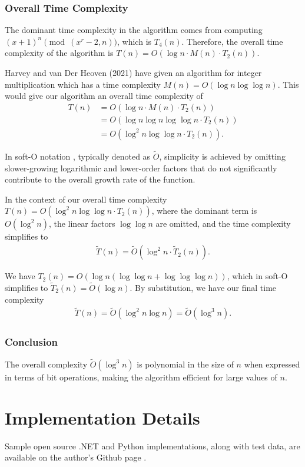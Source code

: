 \documentclass{article}
\theoremstyle{plain}
\theoremstyle{definition}
\begin{document}
\subsubsection{Overall Time Complexity}
The dominant time complexity in the algorithm comes from computing $(x+1)^n \pmod{(x^r-2,n)}$, which is $T_4(n)$. Therefore, the overall time complexity of the algorithm is $T(n) = O(\log n \cdot M(n) \cdot T_2(n))$.

Harvey and van Der Heoven (2021) \cite{harveyvanderhoeven2021} have given an algorithm for integer multiplication which has a time complexity $M(n) = O(\log n \log\log n)$. This would give our algorithm an overall time complexity of
\begin{align*}
    T(n) &= O(\log n \cdot  M(n) \cdot  T_2(n))
    \\ &= O(\log n \log n \log\log n \cdot  T_2(n))
    \\ &= O(\log^2 n \log\log n \cdot  T_2(n)) .
\end{align*}

In soft-O notation \cite{gathengerhard2013softo}, typically denoted as $\tilde{O}$, simplicity is achieved by omitting slower-growing logarithmic and lower-order factors that do not significantly contribute to the overall growth rate of the function.

In the context of our overall time complexity $T(n) = O(\log^2 n \log\log n \cdot T_2(n))$, where the dominant term is $O(\log^2 n)$, the linear factors $\log\log n$ are omitted, and the time complexity simplifies to
\begin{align*}
    \tilde{T}(n) = \tilde{O}(\log^2 n \cdot \tilde{T}_2(n)) .
\end{align*}

We have $T_2(n) = O(\log n (\log \log n + \log \log \log n))$, which in soft-O simplifies to $\tilde{T}_2(n) = \tilde{O}(\log n)$. By substitution, we have our final time complexity
\begin{align*}
    \tilde{T}(n) = \tilde{O}(\log^2 n \log n) = \tilde{O}(\log^3 n) .
\end{align*}

\subsubsection{Conclusion}
The overall complexity $\tilde{O}(\log^3 n)$ is polynomial in the size of $n$ when expressed in terms of bit operations, making the algorithm efficient for large values of $n$.

\section{Implementation Details}
Sample open source .NET and Python implementations, along with test data, are available on the author's Github page \cite{githubrepo}.

\begingroup
\raggedright


\endgroup
\end{document}
